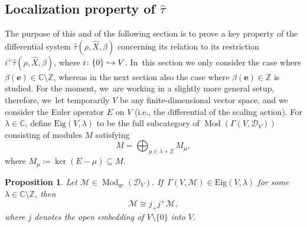\documentclass[11pt]{article}
\newcommand{\ie}{i.e.,\xspace}
\let\mathds\mathbb
\newcommand\hto{\mathrel{\lhook\joinrel\to}}
\newcommand{\bme}{{\boldsymbol{e}}}
\newcommand{\Eig}{\mathrm{Eig}}
\newtheorem{prop}[thm]{Proposition}
\newcommand{\dC}{{\mathds C}}\let\C\dC
\newcommand{\dZ}{{\mathds Z}}\let\mbz\dZ\let\Z\dZ
\begin{document}
\subsection{Localization property of \texorpdfstring{$\widehat{\tau}$}{\textbackslash hat\textbackslash tau}}
\label{subsec:LocProp}

The purpose of this and of the following section is to prove a key property of the differential system $\hat{\tau}(\rho, \hat{X},\beta)$ concerning its relation to its restriction $i^+\hat{\tau}(\rho, \hat{X},\beta)$, where $i \colon \{0\}\hto V$. In~this section we only consider the case where $\beta(\bme)\in\dC\setminus \dZ$, whereas in the next section also the case where $\beta(\bme)\in \dZ$ is studied. For the moment, we~are working in a slightly more general setup, therefore, we~let temporarily $V$ be any finite-dimensional vector space, and we consider the Euler operator $E$ on $V$ (\ie the differential of the scaling action). For $\lambda\in \C$, define $\Eig(V,\lambda)$ to be the full subcategory of $\operatorname{Mod}(\Gamma(V, \mathscr{D}_V))$ consisting of modules $M$ satisfying
\begin{equation}
M = \bigoplus_{\mu\in \lambda + \Z} M_\mu,
\end{equation}
where $M_\mu \coloneqq \ker(E-\mu)\subseteq M$.

\begin{prop}\label{prop:Eig-loc}
Let $\mathscr{M}\in \operatorname{Mod}_{qc} (\mathscr{D}_V)$. If~$\Gamma(V, \mathscr{M})\in \Eig(V,\lambda)$ for some $\lambda\in \C\setminus \Z$, then
\[
\mathscr{M}\cong j_+ j^+\mathscr{M},
\]
where $j$ denotes the open embedding of $V \setminus \{0\}$ into $V$.
\end{prop}
\end{document}
